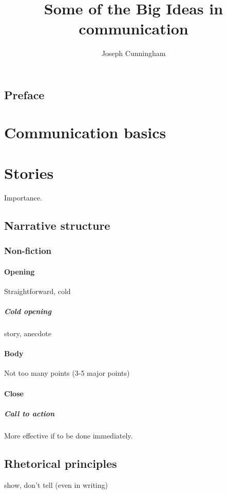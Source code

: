 \documentclass{report}
\title{Some of the Big Ideas in communication}
\author{Joseph Cunningham}
\date{}
\begin{document}
\maketitle
\tableofcontents

\chapter{Preface}

\part{Communication basics}
\setcounter{chapter}{0} %

\part{Stories}
\setcounter{chapter}{0} %
Importance.
\chapter{Narrative structure}
\section{Non-fiction}
\subsection{Opening}
Straightforward, cold
\subsubsection{Cold opening}
story, anecdote
\subsection{Body}
Not too many points (3-5 major points)
\subsection{Close}
\subsubsection{Call to action}
More effective if to be done immediately.

\chapter{Rhetorical principles}
show, don't tell (even in writing)
\end{document}
